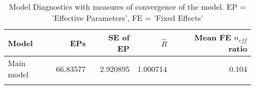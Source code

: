\begin{table}
\centering
\caption{Model Diagnostics with  measures of convergence of the model.
    EP = 'Effective Parameters', FE = 'Fixed Effects'}
\centering
\begin{tabular}[t]{lrrrr}
\toprule
Model & EPs & SE of EP & $\hat{R}$ & Mean FE $n_{eff}$ ratio\\
\midrule
Main model & 66.83577 & 2.920895 & 1.000714 & 0.104\\
\bottomrule
\label{SI-leps-all-diags-2}
\end{tabular}
\end{table}
